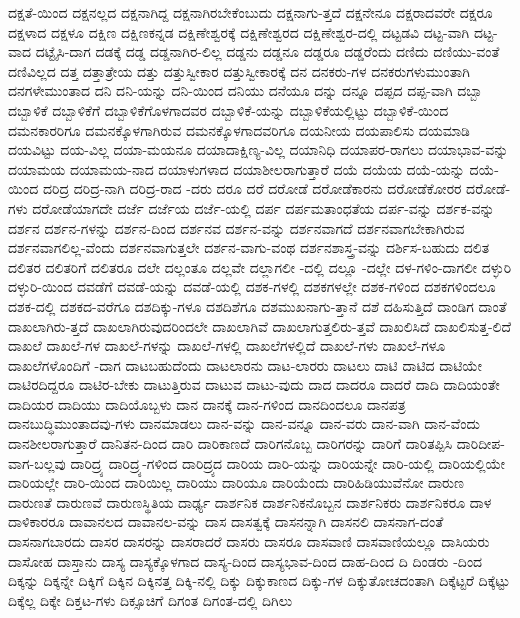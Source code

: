 {ದಕ್ಷತೆ-ಯಿಂದ
ದಕ್ಷನಲ್ಲದ
ದಕ್ಷನಾಗಿದ್ದ
ದಕ್ಷನಾಗಿರಬೇಕೆಂಬುದು
ದಕ್ಷನಾಗು-ತ್ತದೆ
ದಕ್ಷನೇನೂ
ದಕ್ಷರಾದವರೇ
ದಕ್ಷರೂ
ದಕ್ಷಳಾದ
ದಕ್ಷಳೂ
ದಕ್ಷಿಣ
ದಕ್ಷಿಣಕನ್ನಡ
ದಕ್ಷಿಣೇಶ್ವರಕ್ಕೆ
ದಕ್ಷಿಣೇಶ್ವರದ
ದಕ್ಷಿಣೇಶ್ವರ-ದಲ್ಲಿ
ದಟ್ಟಡವಿ
ದಟ್ಟ-ವಾಗಿ
ದಟ್ಟ-ವಾದ
ದಟ್ಟೈಸಿ-ದಾಗ
ದಡಕ್ಕೆ
ದಡ್ಡ
ದಡ್ಡನಾಗಿರ-ಲಿಲ್ಲ
ದಡ್ಡನು
ದಡ್ಡನೂ
ದಡ್ಡರೂ
ದಡ್ಡರೆಂದು
ದಣಿದು
ದಣಿಯು-ವಂತೆ
ದಣಿವಿಲ್ಲದ
ದತ್ತ
ದತ್ತಾತ್ರೇಯ
ದತ್ತು
ದತ್ತುಸ್ವೀಕಾರ
ದತ್ತುಸ್ವೀಕಾರಕ್ಕೆ
ದನ
ದನಕರು-ಗಳ
ದನಕರುಗಳುಮುಂತಾಗಿ
ದನಗಳೇಮುಂತಾದ
ದನಿ
ದನಿ-ಯನ್ನು
ದನಿ-ಯಿಂದ
ದನಿಯು
ದನೆಯೂ
ದನ್ನು
ದನ್ನೂ
ದಪ್ಪದ
ದಪ್ಪ-ವಾಗಿ
ದಬ್ಬಾ
ದಬ್ಬಾಳಿಕೆ
ದಬ್ಬಾಳಿಕೆಗೆ
ದಬ್ಬಾಳಿಕೆಗೊಳಗಾದವರ
ದಬ್ಬಾಳಿಕೆ-ಯನ್ನು
ದಬ್ಬಾಳಿಕೆಯಲ್ಲಿಟ್ಟು
ದಬ್ಬಾಳಿಕೆ-ಯಿಂದ
ದಮನಕಾರರಿಗೂ
ದಮನಕ್ಕೊಳಗಾಗಿರುವ
ದಮನಕ್ಕೊಳಗಾದವರಿಗೂ
ದಯನೀಯ
ದಯಪಾಲಿಸು
ದಯಮಾಡಿ
ದಯವಿಟ್ಟು
ದಯ-ವಿಲ್ಲ
ದಯಾ-ಮಯನೂ
ದಯಾದಾಕ್ಷಿಣ್ಯ-ವಿಲ್ಲ
ದಯಾನಿಧಿ
ದಯಾಪರ-ರಾಗಲು
ದಯಾಭಾವ-ವನ್ನು
ದಯಾಮಯ
ದಯಾಮಯ-ನಾದ
ದಯಾಳುಗಳಾದ
ದಯಾಶೀಲರಾಗುತ್ತಾರೆ
ದಯೆ
ದಯೆಯ
ದಯೆ-ಯನ್ನು
ದಯೆ-ಯಿಂದ
ದರಿದ್ರ
ದರಿದ್ರ-ನಾಗಿ
ದರಿದ್ರ-ರಾದ
-ದರು
ದರೂ
ದರೆ
ದರೋಡೆ
ದರೋಡೆಕಾರನು
ದರೋಡೆಕೋರರ
ದರೋಡೆ-ಗಳು
ದರೋಡೆಯಾಗದೇ
ದರ್ಜೆ
ದರ್ಜೆಯ
ದರ್ಜೆ-ಯಲ್ಲಿ
ದರ್ಪ
ದರ್ಪಮತಾಂಧತೆಯ
ದರ್ಪ-ವನ್ನು
ದರ್ಶಕ-ವನ್ನು
ದರ್ಶನ
ದರ್ಶನ-ಗಳನ್ನು
ದರ್ಶನ-ದಿಂದ
ದರ್ಶನವ
ದರ್ಶನ-ವನ್ನು
ದರ್ಶನವಾಗದೆ
ದರ್ಶನವಾಗಬೇಕಾಗಿರುವ
ದರ್ಶನವಾಗಲಿಲ್ಲ-ವೆಂದು
ದರ್ಶನವಾಗುತ್ತಲೇ
ದರ್ಶನ-ವಾಗು-ವಂಥ
ದರ್ಶನಶಾಸ್ತ್ರ-ವನ್ನು
ದರ್ಶಿಸ-ಬಹುದು
ದಲಿತ
ದಲಿತರ
ದಲಿತರಿಗೆ
ದಲಿತರೂ
ದಲೇ
ದಲ್ಲಂತೂ
ದಲ್ಲವೇ
ದಲ್ಲಾಗಲೀ
-ದಲ್ಲಿ
ದಲ್ಲೂ
-ದಲ್ಲೇ
ದಳ-ಗಳಿಂ-ದಾಗಲೀ
ದಳ್ಳುರಿ
ದಳ್ಳುರಿ-ಯಿಂದ
ದವಡೆಗೆ
ದವಡೆ-ಯನ್ನು
ದವಡೆ-ಯಲ್ಲಿ
ದಶಕ-ಗಳಲ್ಲಿ
ದಶಕಗಳಲ್ಲೇ
ದಶಕ-ಗಳಿಂದ
ದಶಕಗಳಿಂದಲೂ
ದಶಕ-ದಲ್ಲಿ
ದಶಕದ-ವರೆಗೂ
ದಶದಿಕ್ಕು-ಗಳೂ
ದಶದಿಶೆಗೂ
ದಶಮುಖನಾಗು-ತ್ತಾನೆ
ದಶೆ
ದಹಿಸುತ್ತಿದೆ
ದಾಂಡಿಗ
ದಾಂತೆ
ದಾಖಲಾಗಿರು-ತ್ತದೆ
ದಾಖಲಾಗಿರುವುದರಿಂದಲೇ
ದಾಖಲಾಗಿವೆ
ದಾಖಲಾಗುತ್ತಲಿರು-ತ್ತವೆ
ದಾಖಲಿಸಿದೆ
ದಾಖಲಿಸುತ್ತ-ಲಿದೆ
ದಾಖಲೆ
ದಾಖಲೆ-ಗಳ
ದಾಖಲೆ-ಗಳನ್ನು
ದಾಖಲೆ-ಗಳಲ್ಲಿ
ದಾಖಲೆಗಳಲ್ಲಿದೆ
ದಾಖಲೆ-ಗಳು
ದಾಖಲೆ-ಗಳೂ
ದಾಖಲೆಗಳೊಂದಿಗೆ
-ದಾಗ
ದಾಟಬಹುದೆಂದು
ದಾಟಲಾರನು
ದಾಟ-ಲಾರರು
ದಾಟಲು
ದಾಟಿ
ದಾಟಿದ
ದಾಟಿಯೇ
ದಾಟಿರದಿದ್ದರೂ
ದಾಟಿರ-ಬೇಕು
ದಾಟುತ್ತಿರುವ
ದಾಟುವ
ದಾಟು-ವುದು
ದಾದ
ದಾದರೂ
ದಾದರೆ
ದಾದಿ
ದಾದಿಯಂತೇ
ದಾದಿಯರ
ದಾದಿಯು
ದಾದಿಯೊಬ್ಬಳು
ದಾನ
ದಾನಕ್ಕೆ
ದಾನ-ಗಳಿಂದ
ದಾನದಿಂದಲೂ
ದಾನಪತ್ರ
ದಾನಬುದ್ಧಿಮುಂತಾದವು-ಗಳು
ದಾನಮಾಡಲು
ದಾನ-ವನ್ನು
ದಾನ-ವನ್ನೂ
ದಾನ-ವರು
ದಾನ-ವಾಗಿ
ದಾನ-ವೆಂದು
ದಾನಶೀಲರಾಗುತ್ತಾರೆ
ದಾನಿತನ-ದಿಂದ
ದಾರಿ
ದಾರಿಕಾಣದೆ
ದಾರಿಗನೊಬ್ಬ
ದಾರಿಗರನ್ನು
ದಾರಿಗೆ
ದಾರಿತಪ್ಪಿಸಿ
ದಾರಿದೀಪ-ವಾಗ-ಬಲ್ಲವು
ದಾರಿದ್ರ್ಯ
ದಾರಿದ್ರ್ಯ-ಗಳಿಂದ
ದಾರಿದ್ರ್ಯದ
ದಾರಿಯ
ದಾರಿ-ಯನ್ನು
ದಾರಿಯನ್ನೇ
ದಾರಿ-ಯಲ್ಲಿ
ದಾರಿಯಲ್ಲಿಯೇ
ದಾರಿಯಲ್ಲೇ
ದಾರಿ-ಯಿಂದ
ದಾರಿಯಿಲ್ಲ
ದಾರಿಯು
ದಾರಿಯೂ
ದಾರಿಯೆಂದು
ದಾರಿಹಿಡಿಯುವೆನೋ
ದಾರುಣ
ದಾರುಣತೆ
ದಾರುಣವೆ
ದಾರುಣಸ್ಥಿತಿಯ
ದಾರ್ಢ್ಯ
ದಾರ್ಶನಿಕ
ದಾರ್ಶನಿಕನೊಬ್ಬನ
ದಾರ್ಶನಿಕರು
ದಾರ್ಶನಿಕರೂ
ದಾಳ
ದಾಳಿಕಾರರೂ
ದಾವಾನಲದ
ದಾವಾನಲ-ವನ್ನು
ದಾಸ
ದಾಸತ್ವಕ್ಕೆ
ದಾಸನನ್ನಾಗಿ
ದಾಸನಲಿ
ದಾಸನಾಗ-ದಂತೆ
ದಾಸನಾಗಬಾರದು
ದಾಸರ
ದಾಸರನ್ನು
ದಾಸರಾದರೆ
ದಾಸರು
ದಾಸರೂ
ದಾಸವಾಣಿ
ದಾಸವಾಣಿಯಲ್ಲೂ
ದಾಸಿಯರು
ದಾಸೋಹ
ದಾಸ್ತಾನು
ದಾಸ್ಯ
ದಾಸ್ಯಕ್ಕೊಳಗಾದ
ದಾಸ್ಯ-ದಿಂದ
ದಾಸ್ಯಭಾವ-ದಿಂದ
ದಾಹ-ದಿಂದ
ದಿ
ದಿಂಡರು
-ದಿಂದ
ದಿಕ್ಕನ್ನು
ದಿಕ್ಕನ್ನೇ
ದಿಕ್ಕಿಗೆ
ದಿಕ್ಕಿನ
ದಿಕ್ಕಿನತ್ತ
ದಿಕ್ಕಿ-ನಲ್ಲಿ
ದಿಕ್ಕು
ದಿಕ್ಕುಕಾಣದ
ದಿಕ್ಕು-ಗಳ
ದಿಕ್ಕುತೋಚದಂತಾಗಿ
ದಿಕ್ಕೆಟ್ಟರೆ
ದಿಕ್ಕೆಟ್ಟು
ದಿಕ್ಕೆಲ್ಲ
ದಿಕ್ಕೇ
ದಿಕ್ತಟ-ಗಳು
ದಿಕ್ಸೂಚಿಗೆ
ದಿಗಂತ
ದಿಗಂತ-ದಲ್ಲಿ
ದಿಗಿಲು
}
